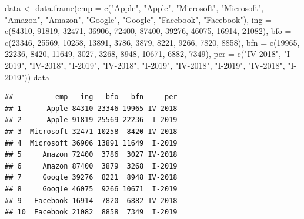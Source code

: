 \documentclass[
]{book}
\newenvironment{Shaded}{\begin{snugshade}}{\end{snugshade}}
\newcommand{\AttributeTok}[1]{\textcolor[rgb]{0.77,0.63,0.00}{#1}}
\newcommand{\DecValTok}[1]{\textcolor[rgb]{0.00,0.00,0.81}{#1}}
\newcommand{\FunctionTok}[1]{\textcolor[rgb]{0.00,0.00,0.00}{#1}}
\newcommand{\NormalTok}[1]{#1}
\newcommand{\OtherTok}[1]{\textcolor[rgb]{0.56,0.35,0.01}{#1}}
\newcommand{\StringTok}[1]{\textcolor[rgb]{0.31,0.60,0.02}{#1}}
\begin{document}
\begin{Shaded}
\begin{Highlighting}[]
\NormalTok{data }\OtherTok{\textless{}{-}} \FunctionTok{data.frame}\NormalTok{(}\AttributeTok{emp =} \FunctionTok{c}\NormalTok{(}\StringTok{"Apple"}\NormalTok{, }\StringTok{"Apple"}\NormalTok{, }\StringTok{"Microsoft"}\NormalTok{,}
  \StringTok{"Microsoft"}\NormalTok{, }\StringTok{"Amazon"}\NormalTok{, }\StringTok{"Amazon"}\NormalTok{, }\StringTok{"Google"}\NormalTok{, }\StringTok{"Google"}\NormalTok{,}
  \StringTok{"Facebook"}\NormalTok{, }\StringTok{"Facebook"}\NormalTok{), }\AttributeTok{ing =} \FunctionTok{c}\NormalTok{(}\DecValTok{84310}\NormalTok{, }\DecValTok{91819}\NormalTok{, }\DecValTok{32471}\NormalTok{,}
  \DecValTok{36906}\NormalTok{, }\DecValTok{72400}\NormalTok{, }\DecValTok{87400}\NormalTok{, }\DecValTok{39276}\NormalTok{, }\DecValTok{46075}\NormalTok{, }\DecValTok{16914}\NormalTok{, }\DecValTok{21082}\NormalTok{), }\AttributeTok{bfo =} \FunctionTok{c}\NormalTok{(}\DecValTok{23346}\NormalTok{,}
  \DecValTok{25569}\NormalTok{, }\DecValTok{10258}\NormalTok{, }\DecValTok{13891}\NormalTok{, }\DecValTok{3786}\NormalTok{, }\DecValTok{3879}\NormalTok{, }\DecValTok{8221}\NormalTok{, }\DecValTok{9266}\NormalTok{, }\DecValTok{7820}\NormalTok{, }\DecValTok{8858}\NormalTok{),}
  \AttributeTok{bfn =} \FunctionTok{c}\NormalTok{(}\DecValTok{19965}\NormalTok{, }\DecValTok{22236}\NormalTok{, }\DecValTok{8420}\NormalTok{, }\DecValTok{11649}\NormalTok{, }\DecValTok{3027}\NormalTok{, }\DecValTok{3268}\NormalTok{, }\DecValTok{8948}\NormalTok{,}
    \DecValTok{10671}\NormalTok{, }\DecValTok{6882}\NormalTok{, }\DecValTok{7349}\NormalTok{), }\AttributeTok{per =} \FunctionTok{c}\NormalTok{(}\StringTok{"IV{-}2018"}\NormalTok{, }\StringTok{"I{-}2019"}\NormalTok{,}
    \StringTok{"IV{-}2018"}\NormalTok{, }\StringTok{"I{-}2019"}\NormalTok{, }\StringTok{"IV{-}2018"}\NormalTok{, }\StringTok{"I{-}2019"}\NormalTok{, }\StringTok{"IV{-}2018"}\NormalTok{,}
    \StringTok{"I{-}2019"}\NormalTok{, }\StringTok{"IV{-}2018"}\NormalTok{, }\StringTok{"I{-}2019"}\NormalTok{))}
\NormalTok{data}
\end{Highlighting}
\end{Shaded}

\begin{verbatim}
##          emp   ing   bfo   bfn     per
## 1      Apple 84310 23346 19965 IV-2018
## 2      Apple 91819 25569 22236  I-2019
## 3  Microsoft 32471 10258  8420 IV-2018
## 4  Microsoft 36906 13891 11649  I-2019
## 5     Amazon 72400  3786  3027 IV-2018
## 6     Amazon 87400  3879  3268  I-2019
## 7     Google 39276  8221  8948 IV-2018
## 8     Google 46075  9266 10671  I-2019
## 9   Facebook 16914  7820  6882 IV-2018
## 10  Facebook 21082  8858  7349  I-2019
\end{verbatim}
\end{document}
